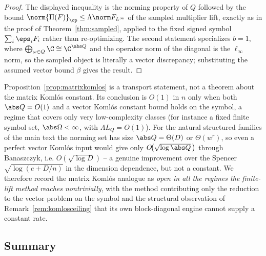\begin{proof}
The displayed inequality is the norming property of $Q$ followed by the bound
$\norm{\Pi(F)}_{\op}\le\Lambda\norm F_{L^\infty}$ of the sampled multiplier lift,
exactly as in the proof of Theorem~\ref{thm:sampled}, applied to the fixed signed
symbol $\sum_i\eps_iF_i$ rather than re-optimizing. The second statement
specializes $b=1$, where $\bigoplus_{\omega\in Q}\C\cong\C^{\abs Q}$ and the
operator norm of the diagonal is the $\ell_\infty$ norm, so the sampled object is
literally a vector discrepancy; substituting the assumed vector bound $\beta$
gives the result.
\end{proof}

\begin{remark}\label{rem:komloshonest}
Proposition~\ref{prop:matrixkomlos} is a transport statement, not a theorem about
the matrix Koml\'os constant. Its conclusion is $O(1)$ in $n$ only when both
$\abs Q=O(1)$ and a vector Koml\'os constant bound holds on the symbol, a regime
that covers only very low-complexity classes (for instance a fixed finite symbol
set, $\abs\Omega<\infty$, with $\Lambda L_Q=O(1)$). For the natural structured
families of the main text the norming set has size $\abs Q=\Theta(D)$ or
$\Theta(w^r)$, so even a perfect vector Koml\'os input would give only
$O\!\big(\sqrt{\log\abs Q}\,\big)$ through Banaszczyk, i.e.
$O(\sqrt{\log D})$ -- a genuine improvement over the Spencer
$\sqrt{\log(e+D/n)}$ in the dimension dependence, but not a constant. We therefore
record the matrix Koml\'os analogue as \emph{open in all the regimes the
finite-lift method reaches nontrivially}, with the method contributing only the
reduction to the vector problem on the symbol and the structural observation of
Remark~\ref{rem:komlosceiling} that its own block-diagonal engine cannot supply a
constant rate.
\end{remark}

\subsection{Summary}
\label{subsec:univsummary}

